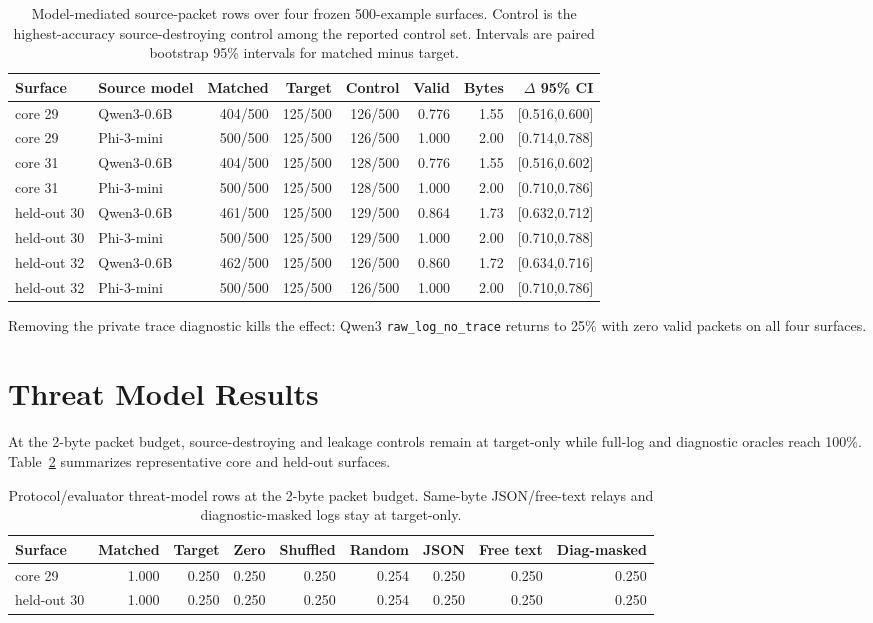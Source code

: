 \documentclass{article}
\begin{document}
\begin{table}[t]
\centering
\small
\begin{tabular}{llrrrrrr}
\toprule
Surface & Source model & Matched & Target & Control & Valid & Bytes & $\Delta$ 95\% CI \\
\midrule
core 29 & Qwen3-0.6B & 404/500 & 125/500 & 126/500 & 0.776 & 1.55 & [0.516,0.600] \\
core 29 & Phi-3-mini & 500/500 & 125/500 & 126/500 & 1.000 & 2.00 & [0.714,0.788] \\
core 31 & Qwen3-0.6B & 404/500 & 125/500 & 128/500 & 0.776 & 1.55 & [0.516,0.602] \\
core 31 & Phi-3-mini & 500/500 & 125/500 & 128/500 & 1.000 & 2.00 & [0.710,0.786] \\
held-out 30 & Qwen3-0.6B & 461/500 & 125/500 & 129/500 & 0.864 & 1.73 & [0.632,0.712] \\
held-out 30 & Phi-3-mini & 500/500 & 125/500 & 129/500 & 1.000 & 2.00 & [0.710,0.788] \\
held-out 32 & Qwen3-0.6B & 462/500 & 125/500 & 126/500 & 0.860 & 1.72 & [0.634,0.716] \\
held-out 32 & Phi-3-mini & 500/500 & 125/500 & 126/500 & 1.000 & 2.00 & [0.710,0.786] \\
\bottomrule
\end{tabular}
\caption{Model-mediated source-packet rows over four frozen 500-example
surfaces. Control is the highest-accuracy source-destroying control among the
reported control set.
Intervals are paired bootstrap 95\% intervals for matched minus target.}
\label{tab:main}
\end{table}

Removing the private trace diagnostic kills the effect: Qwen3
\texttt{raw\_log\_no\_trace} returns to 25\% with zero valid packets on all
four surfaces.

\section{Threat Model Results}

At the 2-byte packet budget, source-destroying and leakage controls remain at
target-only while full-log and diagnostic oracles reach 100\%. Table~\ref{tab:controls}
summarizes representative core and held-out surfaces.

\begin{table}[t]
\centering
\small
\begin{tabular}{lrrrrrrrr}
\toprule
Surface & Matched & Target & Zero & Shuffled & Random & JSON & Free text & Diag-masked \\
\midrule
core 29 & 1.000 & 0.250 & 0.250 & 0.250 & 0.254 & 0.250 & 0.250 & 0.250 \\
held-out 30 & 1.000 & 0.250 & 0.250 & 0.250 & 0.254 & 0.250 & 0.250 & 0.250 \\
\bottomrule
\end{tabular}
\caption{Protocol/evaluator threat-model rows at the 2-byte packet budget.
Same-byte JSON/free-text relays and diagnostic-masked logs stay at target-only.}
\label{tab:controls}
\end{table}
\end{document}
